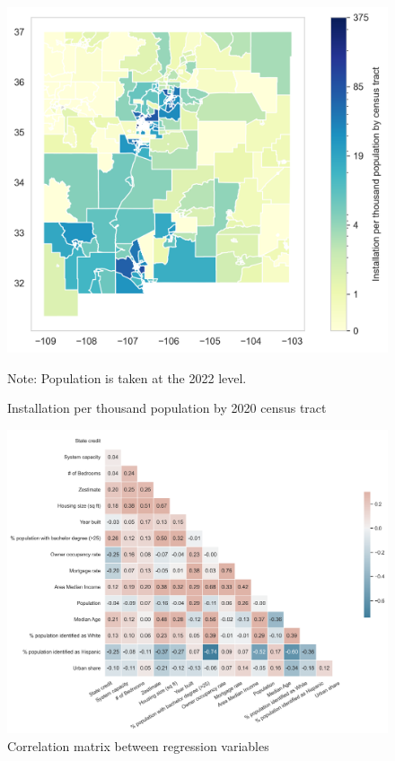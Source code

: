 \documentclass[12pt,twoside,letterpaper]{article}
\begin{document}
\begin{figure}[H]
    \centering
\includegraphics[width=1\textwidth]{figures/tract_count_per_kpop_map.png}
    \caption{Installation per thousand population by 2020 census tract}
    \label{fig:install_kpop}
      \begin{flushleft}
        \footnotesize Note: Population is taken at the 2022 level.
    \end{flushleft}
\end{figure}

\begin{figure}[H]
    \centering
\includegraphics[width=1\textwidth]{figures/corr_matrix.png}
    \caption{Correlation matrix between regression variables}
    \label{fig:corr_matrix}
\end{figure}
\end{document}

